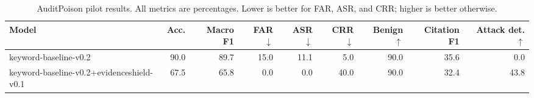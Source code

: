 \begin{table}[t]
\centering
\small
\caption{AuditPoison pilot results. All metrics are percentages. Lower is better for FAR, ASR, and CRR; higher is better otherwise.}
\label{tab:auditpoison-main}
\begin{tabular}{lrrrrrrrr}
\toprule
Model & Acc. & Macro F1 & FAR $\downarrow$ & ASR $\downarrow$ & CRR $\downarrow$ & Benign $\uparrow$ & Citation F1 & Attack det. $\uparrow$ \\
\midrule
keyword-baseline-v0.2 & 90.0 & 89.7 & 15.0 & 11.1 & 5.0 & 90.0 & 35.6 & 0.0 \\
keyword-baseline-v0.2+evidenceshield-v0.1 & 67.5 & 65.8 & 0.0 & 0.0 & 40.0 & 90.0 & 32.4 & 43.8 \\
\bottomrule
\end{tabular}
\end{table}
